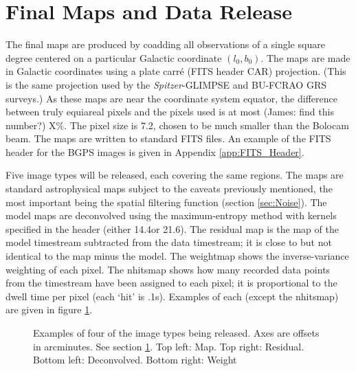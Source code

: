 \documentclass[12pt,preprint]{aastex}
\def\spitzer{{\em Spitzer}}
\def\Figure#1#2#3#4{
\begin{figure}[htb]
\epsscale{#4}
\plotone{#1}
\caption{#2}
\label{#3}
\end{figure}
}
\begin{document}
\clearpage 

\section{Final Maps and Data Release}
\label{sec:FinalMaps}

The final maps are produced by coadding all observations of a single
square degree centered on a particular Galactic coordinate
$(l_0,b_0)$.  The maps are made in Galactic coordinates using a plate
carr\'{e} (FITS header CAR) projection.  (This is the same projection
used by the \spitzer-GLIMPSE and BU-FCRAO GRS surveys.)  As these maps
are near the coordinate system equator, the difference between truly
equiareal pixels and the pixels used is at most (James: find this number?) X\%.  The pixel size
is 7.2\arcsec, chosen to be much smaller than the Bolocam beam.
The maps are written to standard FITS files.  An example of the FITS
header for the BGPS images is given in Appendix \ref{app:FITS_Header}.

Five image types will be released, each covering the same regions.  The maps
are standard astrophysical maps subject to the caveats previously mentioned,
the most important being the spatial filtering function (section \ref{sec:Noise}).
The model maps are deconvolved using the maximum-entropy method with kernels
specified in the header (either 14.4\arcsec or 21.6\arcsec).  The residual map is the map of the model timestream
subtracted from the data timestream; it is close to but not identical to the
map minus the model.  The weightmap shows the inverse-variance weighting of
each pixel.  The nhitsmap shows how many recorded data points from the
timestream have been assigned to each pixel; it is proportional to the dwell
time per pixel (each `hit' is .1s).  Examples of each (except the nhitsmap)
are given in figure \ref{fig:sampleimages}.

\Figure{image_types}{Examples of four of the image types being released.  Axes are offsets
in arcminutes.  See section \ref{sec:FinalMaps}. Top
left: Map.  Top right: Residual.  Bottom left: Deconvolved.  Bottom right:
Weight}{fig:sampleimages}{1.0}

\end{document}
